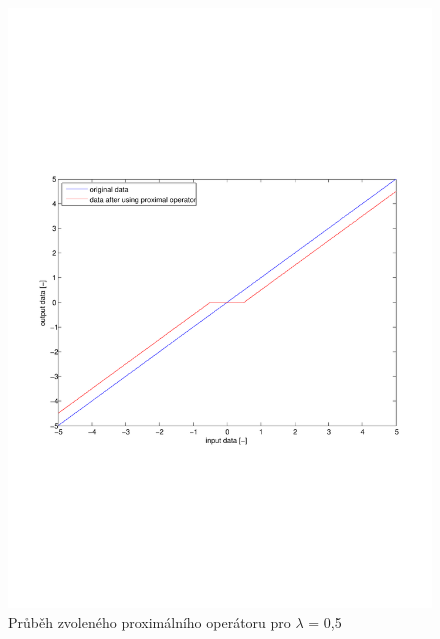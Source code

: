 \documentclass[FM,BP]{tulthesis}
\begin{document}
\begin{figure}[!ht]
\begin{center}
\includegraphics[scale=0.7]{obr/threshhold.pdf}
\end{center}
\caption{Průběh zvoleného proximálního operátoru pro $\lambda$ = 0,5}
\label{fig:threshhold}
\end{figure}
\end{document}
